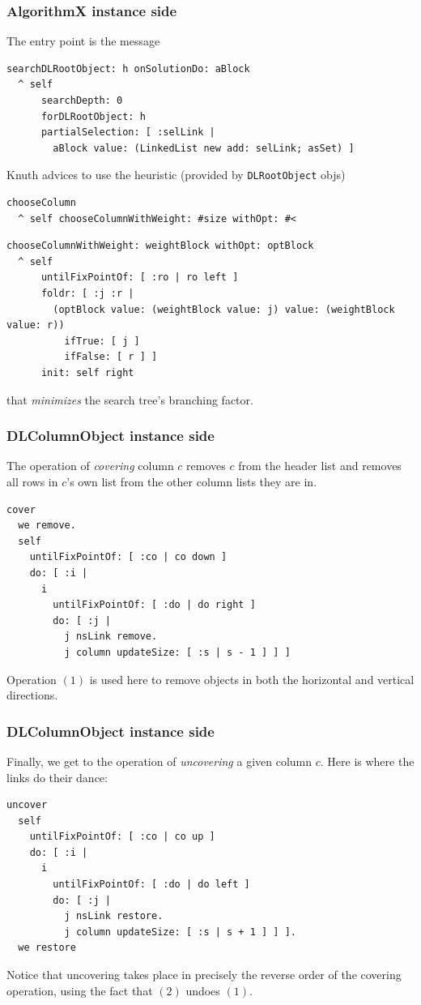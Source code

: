 \documentclass[10pt]{beamer}
\begin{document}
\begin{frame}[fragile]
\frametitle{AlgorithmX instance side}
The entry point is the message
\vfill
\begin{verbatim}
searchDLRootObject: h onSolutionDo: aBlock
  ^ self
      searchDepth: 0
      forDLRootObject: h
      partialSelection: [ :selLink | 
        aBlock value: (LinkedList new add: selLink; asSet) ]
\end{verbatim}
\vfill
Knuth advices to use the heuristic (provided by \texttt{DLRootObject} objs)
\begin{verbatim}
chooseColumn
  ^ self chooseColumnWithWeight: #size withOpt: #<
\end{verbatim}
\begin{verbatim}
chooseColumnWithWeight: weightBlock withOpt: optBlock
  ^ self
      untilFixPointOf: [ :ro | ro left ]
      foldr: [ :j :r | 
        (optBlock value: (weightBlock value: j) value: (weightBlock value: r))
          ifTrue: [ j ]
          ifFalse: [ r ] ]
      init: self right
\end{verbatim}
that \textit{minimizes} the search tree's branching factor.
\end{frame}

\begin{frame}[fragile]
\frametitle{DLColumnObject instance side}
The operation of \emph{covering} column $c$ removes $c$ from the header list and removes all rows in $c$'s own list from the other column lists they are in.
\vfill
\begin{verbatim}
cover
  we remove.
  self
    untilFixPointOf: [ :co | co down ]
    do: [ :i | 
      i
        untilFixPointOf: [ :do | do right ]
        do: [ :j | 
          j nsLink remove.
          j column updateSize: [ :s | s - 1 ] ] ]
\end{verbatim}
\vfill
Operation $(1)$ is used here to remove objects in both the horizontal and vertical directions.
\end{frame}

\begin{frame}[fragile]
\frametitle{DLColumnObject instance side}
Finally, we get to the operation of \textit{uncovering} a given column $c$. 
Here is where the links do their dance:
\vfill
\begin{verbatim}
uncover
  self
    untilFixPointOf: [ :co | co up ]
    do: [ :i | 
      i
        untilFixPointOf: [ :do | do left ]
        do: [ :j | 
          j nsLink restore.
          j column updateSize: [ :s | s + 1 ] ] ].
  we restore
\end{verbatim}
\vfill
Notice that uncovering takes place in precisely the reverse order of the 
covering operation, using the fact that $(2)$ undoes $(1)$.
\end{frame}
\end{document}
